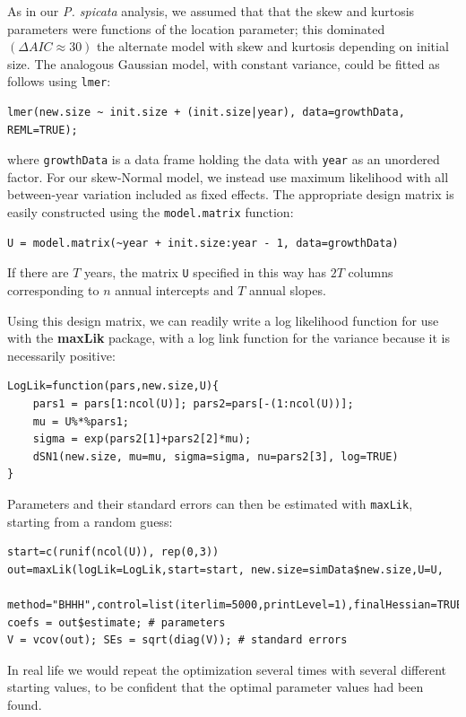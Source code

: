 \documentclass[11pt]{article}
\begin{document}
{As in our \emph{P. spicata} analysis, we assumed that that the skew and kurtosis parameters were functions
of the location parameter; this dominated $(\Delta AIC \approx 30)$ the alternate 
model with skew and kurtosis depending on initial size.   
The analogous Gaussian model, with constant variance, could be fitted as follows using \texttt{lmer}:
\begin{lstlisting}
lmer(new.size ~ init.size + (init.size|year), data=growthData, REML=TRUE); 
\end{lstlisting}
where \texttt{growthData} is a data frame holding the data with \texttt{year} as an unordered factor. For our skew-Normal
model, we instead use maximum likelihood with all between-year variation included as fixed effects. The appropriate design
matrix is easily constructed using the \texttt{model.matrix} function: 
\begin{lstlisting}
U = model.matrix(~year + init.size:year - 1, data=growthData)
\end{lstlisting}
If there are $T$ years, the matrix \texttt{U} specified in this way has $2T$ columns corresponding to $n$ annual 
intercepts and $T$ annual slopes. 

Using this design matrix, we can readily write a log likelihood function for use with 
the \textbf{maxLik} package, with a log link function for the variance because it is necessarily positive: 
\begin{lstlisting}
LogLik=function(pars,new.size,U){
    pars1 = pars[1:ncol(U)]; pars2=pars[-(1:ncol(U))];
    mu = U%*%pars1;  
    sigma = exp(pars2[1]+pars2[2]*mu);
    dSN1(new.size, mu=mu, sigma=sigma, nu=pars2[3], log=TRUE)
}
\end{lstlisting} 

Parameters and their standard errors can then be estimated with \texttt{maxLik}, 
starting from a random guess: 
\begin{lstlisting}
start=c(runif(ncol(U)), rep(0,3))
out=maxLik(logLik=LogLik,start=start, new.size=simData$new.size,U=U,
  method="BHHH",control=list(iterlim=5000,printLevel=1),finalHessian=TRUE);
coefs = out$estimate; # parameters
V = vcov(out); SEs = sqrt(diag(V));	# standard errors 
\end{lstlisting}  
In real life we would repeat the optimization several times with several different starting values, to be confident that
the optimal parameter values had been found. 

}
\end{document}
